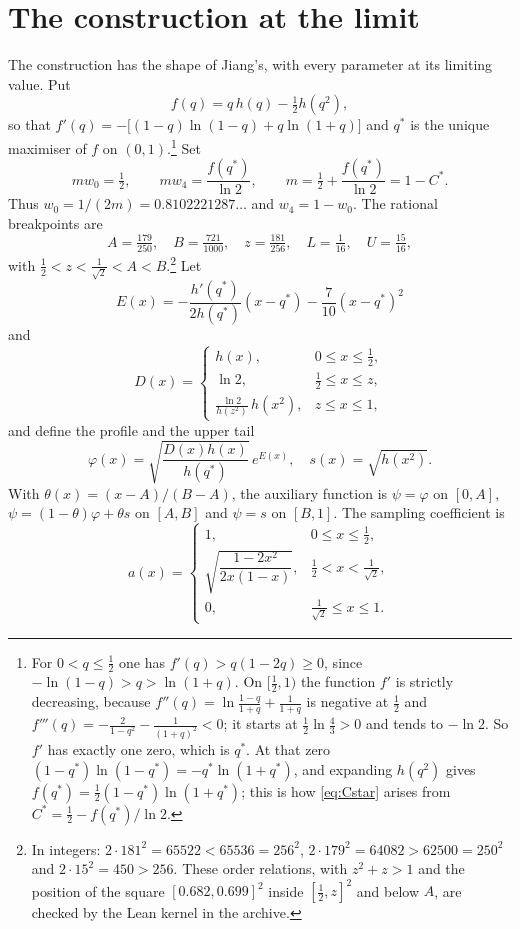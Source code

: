 \documentclass[aps,prd,twocolumn,superscriptaddress,nofootinbib,longbibliography,floatfix,amsmath,amssymb,10pt]{revtex4-2}
\theoremstyle{plain}
\theoremstyle{definition}
\theoremstyle{plain}
\newcommand{\qs}{q^{*}}
\newcommand{\Cs}{C^{*}}
\begin{document}
\section{The construction at the limit}\label{sec:construction}

The construction has the shape of Jiang's, with every parameter at its limiting value. Put
\[
f(q)=q\,h(q)-\tfrac12 h(q^2),
\]
so that $f'(q)=-\bigl[(1-q)\ln(1-q)+q\ln(1+q)\bigr]$ and $\qs$ is the unique maximiser of $f$ on $(0,1)$.\footnote{For $0<q\le\frac12$ one has $f'(q)>q(1-2q)\ge 0$, since $-\ln(1-q)>q>\ln(1+q)$. On $[\frac12,1)$ the function $f'$ is strictly decreasing, because $f''(q)=\ln\frac{1-q}{1+q}+\frac1{1+q}$ is negative at $\frac12$ and $f'''(q)=-\frac{2}{1-q^2}-\frac{1}{(1+q)^2}<0$; it starts at $\frac12\ln\frac43>0$ and tends to $-\ln 2$. So $f'$ has exactly one zero, which is $\qs$. At that zero $(1-\qs)\ln(1-\qs)=-\qs\ln(1+\qs)$, and expanding $h(q^2)$ gives $f(\qs)=\frac12(1-\qs)\ln(1+\qs)$; this is how \eqref{eq:Cstar} arises from $\Cs=\frac12-f(\qs)/\ln2$.} Set
\begin{equation}\label{eq:weights}
mw_0=\tfrac12,\qquad mw_4=\frac{f(\qs)}{\ln 2},\qquad m=\tfrac12+\frac{f(\qs)}{\ln 2}=1-\Cs .
\end{equation}
Thus $w_0=1/(2m)=0.8102221287\ldots$ and $w_4=1-w_0$. The rational breakpoints are
\[
A=\tfrac{179}{250},\quad B=\tfrac{721}{1000},\quad z=\tfrac{181}{256},\quad L=\tfrac1{16},\quad U=\tfrac{15}{16},
\]
with $\frac12<z<\frac1{\sqrt2}<A<B$.\footnote{In integers: $2\cdot181^2=65522<65536=256^2$, $2\cdot179^2=64082>62500=250^2$ and $2\cdot 15^2=450>256$. These order relations, with $z^2+z>1$ and the position of the square $[0.682,0.699]^2$ inside $[\frac12,z]^2$ and below $A$, are checked by the Lean kernel in the archive.} Let
\[
E(x)=-\frac{h'(\qs)}{2h(\qs)}(x-\qs)-\frac{7}{10}(x-\qs)^2
\]
and
\[
D(x)=\begin{cases} h(x), & 0\le x\le \frac12,\\[2pt] \ln 2, & \frac12\le x\le z,\\[2pt] \frac{\ln 2}{h(z^2)}\,h(x^2), & z\le x\le 1,\end{cases}
\]
and define the profile and the upper tail
\begin{equation}\label{eq:phi}
\varphi(x)=\sqrt{\frac{D(x)h(x)}{h(\qs)}}\,e^{E(x)},\quad s(x)=\sqrt{h(x^2)} .
\end{equation}
With $\theta(x)=(x-A)/(B-A)$, the auxiliary function is $\psi=\varphi$ on $[0,A]$, $\psi=(1-\theta)\varphi+\theta s$ on $[A,B]$ and $\psi=s$ on $[B,1]$. The sampling coefficient is
\begin{equation}\label{eq:a}
a(x)=\begin{cases}1, & 0\le x\le\frac12,\\[2pt] \sqrt{\dfrac{1-2x^2}{2x(1-x)}}, & \frac12<x<\frac1{\sqrt2},\\[6pt] 0, & \frac1{\sqrt2}\le x\le 1.\end{cases}
\end{equation}
\end{document}
